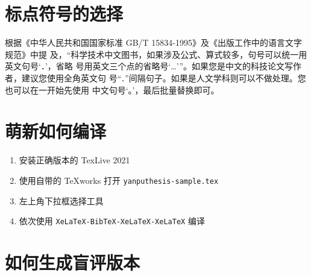\documentclass[lang=chs, degree=master, blindreview=false, adobe=false]{yanputhesis}
\begin{document}
\section{标点符号的选择}

根据《中华人民共和国国家标准 GB/T 15834-1995》及《出版工作中的语言文字规范》中提
及，“科学技术中文图书，如果涉及公式、算式较多，句号可以统一用英文句号‘．’，省略
号用英文三个点的省略号‘…’”。如果您是中文的科技论文写作者，建议您使用全角英文句
号“\lstinline`．`”间隔句子。如果是人文学科则可以不做处理。您也可以在一开始先使用
中文句号‘。’，最后批量替换即可。

\section{萌新如何编译}

\begin{enumerate}
    \setlength{\itemsep}{0pt}
    \item 安装正确版本的 TexLive 2021
    \item 使用自带的 TeXworks 打开 \lstinline`yanputhesis-sample.tex`
    \item 左上角下拉框选择工具
    \item 依次使用 \lstinline`XeLaTeX-BibTeX-XeLaTeX-XeLaTeX` 编译
\end{enumerate}

\section{如何生成盲评版本}
\end{document}
